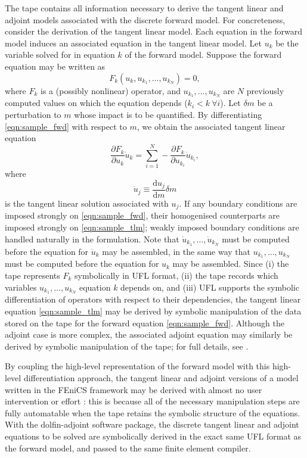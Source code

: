 \documentclass{siamltex}
\begin{document}
The tape contains all information necessary to derive the tangent linear and adjoint models associated with the discrete forward model.
For concreteness, consider the derivation of the
tangent linear model. Each equation in the forward model induces an associated equation in the tangent linear model.
Let $u_k$ be the variable solved for in equation $k$ of the forward model. Suppose the forward equation may be written
as
\begin{equation} \label{eqn:sample_fwd}
  F_k(u_k, u_{k_1}, \dots, u_{k_N}) = 0,
\end{equation}
where $F_k$ is a (possibly nonlinear) operator, and $u_{k_1}, \dots, u_{k_N}$ are $N$ previously computed values on which the equation depends ($k_i < k \ \forall i$).
Let $\delta{m}$ be a perturbation to $m$ whose impact is to be quantified.
By differentiating \eqref{eqn:sample_fwd} with respect to $m$, we obtain the associated tangent linear equation
\begin{equation} \label{eqn:sample_tlm}
  \frac{\partial F_k}{\partial u_k} \dot{u}_k = \sum_{i=1}^{N} -\frac{\partial F_k}{\partial u_{k_i}} \dot{u}_{k_i},
\end{equation}
where 
\begin{equation}
  \dot{u}_j \equiv \dfrac{\mathrm{d}u_j}{\mathrm{d}m} \delta{m}
\end{equation}
is the tangent linear solution associated with $u_j$. If any boundary conditions are imposed strongly
on \eqref{eqn:sample_fwd}, their homogenised counterparts are imposed strongly on \eqref{eqn:sample_tlm}; weakly imposed
boundary conditions are handled naturally in the formulation. Note that $\dot{u}_{k_1}, \dots, \dot{u}_{k_N}$ must be computed before 
the equation for $\dot{u}_k$ may be assembled, in the same way that $u_{k_1}, \dots, u_{k_N}$ must be computed before the equation for
$u_k$ may be assembled. Since (i) the tape represents $F_k$ symbolically in UFL format, (ii) the tape records which variables
$u_{k_1}, \dots, u_{k_N}$ equation $k$ depends on, and (iii) UFL supports the symbolic differentiation
of operators with respect to their dependencies, the tangent linear equation \eqref{eqn:sample_tlm} may be derived by symbolic manipulation of the
data stored on the tape for the forward equation \eqref{eqn:sample_fwd}. 
Although the adjoint case is more complex, the associated adjoint equation may similarly be
derived by symbolic manipulation of the tape; for full details, see \cite{farrell2012b}.

By coupling the high-level representation of the forward model with this high-level differentiation approach,
the tangent linear and adjoint versions of a model written in the FEniCS framework may be derived with almost no user
intervention or effort \cite{farrell2012b}: this is because all of the necessary manipulation steps are fully automatable when
the tape retains the symbolic structure of the equations. With the dolfin-adjoint software package, the discrete tangent linear and adjoint equations
to be solved are symbolically derived in the exact same UFL format as the forward model, and passed to the same finite element
compiler.
\end{document}
